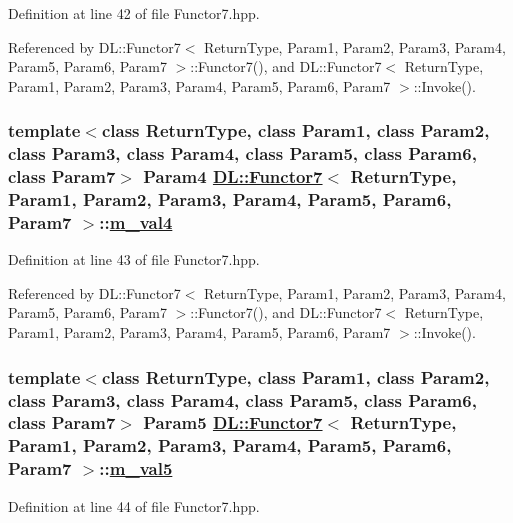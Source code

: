 Definition at line 42 of file Functor7.hpp.

Referenced by DL::Functor7$<$ Return\-Type, Param1, Param2, Param3, Param4, Param5, Param6, Param7 $>$::Functor7(), and DL::Functor7$<$ Return\-Type, Param1, Param2, Param3, Param4, Param5, Param6, Param7 $>$::Invoke().\hypertarget{classDL_1_1Functor7_r4}{
\subsubsection[m\_\-val4]{\setlength{\rightskip}{0pt plus 5cm}template$<$class Return\-Type, class Param1, class Param2, class Param3, class Param4, class Param5, class Param6, class Param7$>$ Param4 \hyperlink{classDL_1_1Functor7}{DL::Functor7}$<$ Return\-Type, Param1, Param2, Param3, Param4, Param5, Param6, Param7 $>$::\hyperlink{classDL_1_1Functor7_r4}{m\_\-val4}}}
\label{classDL_1_1Functor7_r4}




Definition at line 43 of file Functor7.hpp.

Referenced by DL::Functor7$<$ Return\-Type, Param1, Param2, Param3, Param4, Param5, Param6, Param7 $>$::Functor7(), and DL::Functor7$<$ Return\-Type, Param1, Param2, Param3, Param4, Param5, Param6, Param7 $>$::Invoke().\hypertarget{classDL_1_1Functor7_r5}{
\subsubsection[m\_\-val5]{\setlength{\rightskip}{0pt plus 5cm}template$<$class Return\-Type, class Param1, class Param2, class Param3, class Param4, class Param5, class Param6, class Param7$>$ Param5 \hyperlink{classDL_1_1Functor7}{DL::Functor7}$<$ Return\-Type, Param1, Param2, Param3, Param4, Param5, Param6, Param7 $>$::\hyperlink{classDL_1_1Functor7_r5}{m\_\-val5}}}
\label{classDL_1_1Functor7_r5}




Definition at line 44 of file Functor7.hpp.

